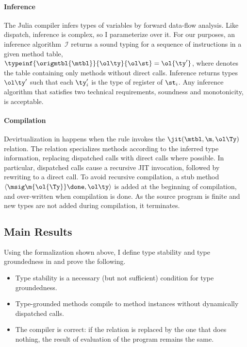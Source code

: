 \paragraph{Inference}\label{sec:infer}

The Julia compiler infers types of variables by forward data-flow analysis. Like
dispatch, inference is complex, so I parameterize over it. For our purposes, an
inference algorithm~$\mathcal I$ returns a sound typing for a sequence of
instructions in a given method table,
$\typeinf{\origmtbl{\mtbl}}{\ol\ty}{\ol\st}=\ol{\ty'}$, where \origmtbl{\mtbl}
denotes the table containing only methods without direct calls. Inference
returns types $\ol\ty'$ such that each $\ty'_i$ is the type of register of
$\st_i$. Any inference algorithm that satisfies two technical requirements, soundness and
monotonicity, is acceptable.

\paragraph{Compilation}\label{sec:comp}
%
Devirtualization in \jules happens when the  rule invokes the
$\jit(\mtbl,\m,\ol\Ty)$ relation. The relation specializes methods according to
the inferred type information, replacing
dispatched calls with direct calls where
possible. In particular, dispatched calls
cause a recursive JIT invocation, followed by rewriting to a direct call. To
avoid recursive compilation, a stub method $\langle \msig\m{\ol{\Ty}}\done,
\ol\ty \rangle$ is added at the beginning of compilation,
and over-written when compilation is done. As the source program is finite and
new types are not added during compilation, it terminates.


\subsection{Main Results}%
\label{sec:stability-formal}\label{sec:jit-correct}

Using the formalization shown above, I define type stability and type
groundedness in \jules and prove the following.

\begin{itemize}
  \item
Type stability is a necessary (but not sufficient)
condition for type groundedness.

  \item
Type-grounded methods
compile to method instances without dynamically dispatched calls.

  \item
The compiler is correct: if the \jit relation is replaced by the one that
does nothing, the result of evaluation of the program remains the same.
\end{itemize}

